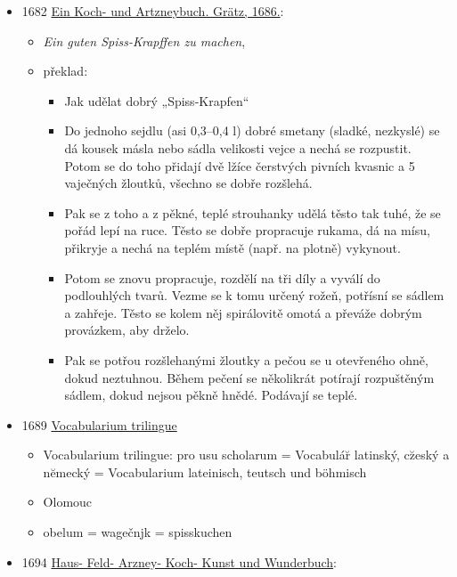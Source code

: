 \begin{itemize}
  \begin{itemize}
  \tightlist
  \item
     měl by to být překlad receptu od Marxe Rumpolta
  \end{itemize}
\item
  1682
  \href{https://www.deutschestextarchiv.de/book/view/graz_kochbuch_1686/?hl=Spie\%C3\%9F&p=43}{Ein
  Koch- und Artzneybuch. Grätz, 1686.}:

  \begin{itemize}
  \tightlist
  \item
     \emph{Ein guten Spiss-Krapffen zu machen},
  \item
    překlad:

    \begin{itemize}
    \tightlist
    \item
      Jak udělat dobrý „Spiss-Krapfen``
    \item
      Do jednoho sejdlu (asi 0,3--0,4 l) dobré smetany (sladké,
      nezkyslé) se dá kousek másla nebo sádla velikosti vejce a nechá se
      rozpustit. Potom se do toho přidají dvě lžíce čerstvých pivních
      kvasnic a 5 vaječných žloutků, všechno se dobře rozšlehá.
    \item
      Pak se z toho a z pěkné, teplé strouhanky udělá těsto tak tuhé, že
      se pořád lepí na ruce. Těsto se dobře propracuje rukama, dá na
      mísu, přikryje a nechá na teplém místě (např. na plotně) vykynout.
    \item
      Potom se znovu propracuje, rozdělí na tři díly a vyválí do
      podlouhlých tvarů. Vezme se k tomu určený rožeň, potřísní se
      sádlem a zahřeje. Těsto se kolem něj spirálovitě omotá a převáže
      dobrým provázkem, aby drželo.
    \item
      Pak se potřou rozšlehanými žloutky a pečou se u otevřeného ohně,
      dokud neztuhnou. Během pečení se několikrát potírají rozpuštěným
      sádlem, dokud nejsou pěkně hnědé. Podávají se teplé.
    \end{itemize}
  \end{itemize}
\item
  1689
  \href{https://www.digitale-sammlungen.de/view/bsb11105115?page=42\%2C43}{Vocabularium
  trilingue}

  \begin{itemize}
  \tightlist
  \item
    Vocabularium trilingue: pro usu scholarum = Vocabulár̆ latinský,
    cz̆eský a nĕmecký = Vocabularium lateinisch, teutsch und böhmisch
  \item
    Olomouc
  \item
    obelum = wagečnjk = spisskuchen
  \end{itemize}
\item
  1694
  \href{https://books.google.cz/books?id=PytAAAAAcAAJ&hl=cs&pg=PA876\#v=onepage&q&f=false}{Haus-
  Feld- Arzney- Koch- Kunst und Wunderbuch}:


\end{itemize}
